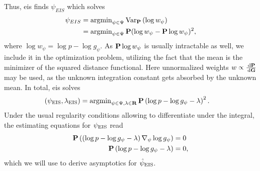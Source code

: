 Thus, \gls{eis} finds $\psi_{EIS}$ which solves 
\begin{align*}
\psi_{EIS} &= \argmin_{\psi \in\Psi} \text{Var}_{\P} \left( \log w_{\psi} \right) \\
    &= \argmin_{\psi \in \Psi} \P (\log w_{\psi} - \P \log w_{\psi})^{2},
\end{align*}
where $\log w_{\psi} = \log p - \log g_{\psi}$.
As $\P \log w_{\psi}$ is usually intractable as well, we include it in the optimization problem, utilizing the fact that the mean is the minimizer of the squared distance functional.
Here unnormalized weights $w \propto \frac{\d\P}{\d\G}$ may be used, as the unknown integration constant gets absorbed by the unknown mean. In total, \gls{eis} solves
\begin{align*}
\left(\psi_{\text{EIS}}, \lambda_{\text{EIS}}\right) &= \argmin_{\psi \in\Psi, \lambda \in \mathbf R} \P \left( \log p - \log g_{\psi} - \lambda \right)^{2}.
\end{align*}
Under the usual regularity conditions allowing to differentiate under the integral, the estimating equations for $\peis$ read
\begin{align}
    \begin{split}
    \label{eq:eis-optimal}
    \P \left(\left( \log p - \log g_{\psi} - \lambda \right) \nabla_{\psi}\log g_{\psi}\right)&=0\\
    \P \left( \log p - \log g_{\psi} - \lambda \right)&=0,
    \end{split}
\end{align}
which we will use to derive asymptotics for $\hpeis$. 

